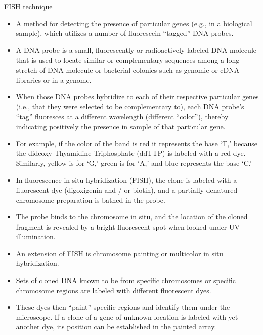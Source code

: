\documentclass[11pt,dvipsnames,ignorenonframetext,aspectratio=169]{beamer}
\providecommand{\tightlist}{%
  \setlength{\itemsep}{0pt}\setlength{\parskip}{0pt}}
\begin{document}
\begin{frame}{FISH technique}
\protect\hypertarget{fish-technique}{}

\begin{itemize}
\tightlist
\item
  A method for detecting the presence of particular genes (e.g., in a
  biological sample), which utilizes a number of fluorescein-``tagged''
  DNA probes.
\item
  A DNA probe is a small, fluorescently or radioactively labeled DNA
  molecule that is used to locate similar or complementary sequences
  among a long stretch of DNA molecule or bacterial colonies such as
  genomic or cDNA libraries or in a genome.
\item
  When those DNA probes hybridize to each of their respective particular
  genes (i.e., that they were selected to be complementary to), each DNA
  probe's ``tag'' fluoresces at a different wavelength (different
  ``color''), thereby indicating positively the presence in sample of
  that particular gene.
\end{itemize}

\end{frame}

\begin{frame}{}
\protect\hypertarget{section-3}{}

\begin{itemize}
\tightlist
\item
  For example, if the color of the band is red it represents the base
  `T,' because the dideoxy Thyamidine Triphosphate (ddTTP) is labeled
  with a red dye. Similarly, yellow is for `G,' green is for `A,' and
  blue represents the base `C.'
\item
  In fluorescence in situ hybridization (FISH), the clone is labeled
  with a fluorescent dye (digoxigenin and / or biotin), and a partially
  denatured chromosome preparation is bathed in the probe.
\end{itemize}

\end{frame}

\begin{frame}{}
\protect\hypertarget{section-4}{}

\begin{itemize}
\tightlist
\item
  The probe binds to the chromosome in situ, and the location of the
  cloned fragment is revealed by a bright fluorescent spot when looked
  under UV illumination.
\item
  An extension of FISH is chromosome painting or multicolor in situ
  hybridization.
\item
  Sets of cloned DNA known to be from specific chromosomes or specific
  chromosome regions are labeled with different fluorescent dyes.
\item
  These dyes then ``paint'' specific regions and identify them under the
  microscope. If a clone of a gene of unknown location is labeled with
  yet another dye, its position can be established in the painted array.
\end{itemize}

\end{frame}
\end{document}
